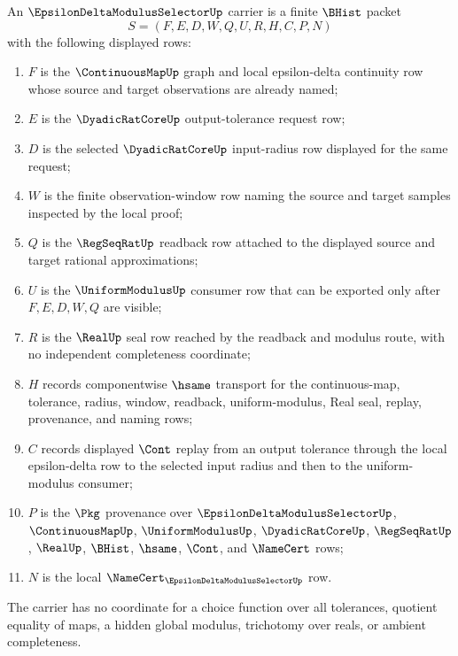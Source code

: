 \begin{definition}
\label{def:epsilon-delta-modulus-selector-carrier}
An $\EpsilonDeltaModulusSelectorUp$ carrier is a finite $\BHist$ packet
$$
S=(F,E,D,W,Q,U,R,H,C,P,N)
$$
with the following displayed rows:
\begin{enumerate}
\item $F$ is the $\ContinuousMapUp$ graph and local epsilon-delta continuity row whose source and target observations are already named;
\item $E$ is the $\DyadicRatCoreUp$ output-tolerance request row;
\item $D$ is the selected $\DyadicRatCoreUp$ input-radius row displayed for the same request;
\item $W$ is the finite observation-window row naming the source and target samples inspected by the local proof;
\item $Q$ is the $\RegSeqRatUp$ readback row attached to the displayed source and target rational approximations;
\item $U$ is the $\UniformModulusUp$ consumer row that can be exported only after $F,E,D,W,Q$ are visible;
\item $R$ is the $\RealUp$ seal row reached by the readback and modulus route, with no independent completeness coordinate;
\item $H$ records componentwise $\hsame$ transport for the continuous-map, tolerance, radius, window, readback, uniform-modulus, Real seal, replay, provenance, and naming rows;
\item $C$ records displayed $\Cont$ replay from an output tolerance through the local epsilon-delta row to the selected input radius and then to the uniform-modulus consumer;
\item $P$ is the $\Pkg$ provenance over $\EpsilonDeltaModulusSelectorUp$, $\ContinuousMapUp$, $\UniformModulusUp$, $\DyadicRatCoreUp$, $\RegSeqRatUp$, $\RealUp$, $\BHist$, $\hsame$, $\Cont$, and $\NameCert$ rows;
\item $N$ is the local $\NameCert_{\EpsilonDeltaModulusSelectorUp}$ row.
\end{enumerate}
The carrier has no coordinate for a choice function over all tolerances, quotient equality of maps, a hidden global modulus, trichotomy over reals, or ambient completeness.
\end{definition}

